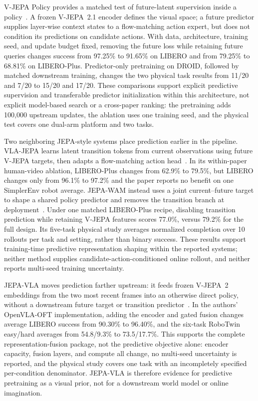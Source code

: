 V-JEPA Policy provides a matched test of future-latent supervision inside a policy~\cite{zhang2026vjepapolicy}. A frozen V-JEPA~2.1 encoder defines the visual space; a future predictor supplies layer-wise context states to a flow-matching action expert, but does not condition its predictions on candidate actions. With data, architecture, training seed, and update budget fixed, removing the future loss while retaining future queries changes success from 97.25\% to 91.65\% on LIBERO and from 79.25\% to 68.81\% on LIBERO-Plus. Predictor-only pretraining on DROID, followed by matched downstream training, changes the two physical task results from 11/20 and 7/20 to 15/20 and 17/20. These comparisons support explicit predictive supervision and transferable predictor initialization within this architecture, not explicit model-based search or a cross-paper ranking: the pretraining adds 100,000 upstream updates, the ablation uses one training seed, and the physical test covers one dual-arm platform and two tasks.

Two neighboring JEPA-style systems place prediction earlier in the pipeline. VLA-JEPA learns latent transition tokens from current observations using future V-JEPA targets, then adapts a flow-matching action head~\cite{sun2026vlajepa}. In its within-paper human-video ablation, LIBERO-Plus changes from 62.9\% to 79.5\%, but LIBERO changes only from 96.1\% to 97.2\% and the paper reports no benefit on one SimplerEnv robot average. JEPA-WAM instead uses a joint current--future target to shape a shared policy predictor and removes the transition branch at deployment~\cite{lin2026jepawam}. Under one matched LIBERO-Plus recipe, disabling transition prediction while retaining V-JEPA features scores 77.0\%, versus 79.2\% for the full design. Its five-task physical study averages normalized completion over 10 rollouts per task and setting, rather than binary success. These results support training-time predictive representation shaping within the reported systems; neither method supplies candidate-action-conditioned online rollout, and neither reports multi-seed training uncertainty.

JEPA-VLA moves prediction farther upstream: it feeds frozen V-JEPA~2 embeddings from the two most recent frames into an otherwise direct policy, without a downstream future target or transition predictor~\cite{miao2026jepavla}. In the authors' OpenVLA-OFT implementation, adding the encoder and gated fusion changes average LIBERO success from 90.30\% to 96.40\%, and the six-task RoboTwin easy/hard averages from 54.8/9.3\% to 73.5/17.7\%. This supports the complete representation-fusion package, not the predictive objective alone: encoder capacity, fusion layers, and compute all change, no multi-seed uncertainty is reported, and the physical study covers one task with an incompletely specified per-condition denominator. JEPA-VLA is therefore evidence for predictive pretraining as a visual prior, not for a downstream world model or online imagination.

